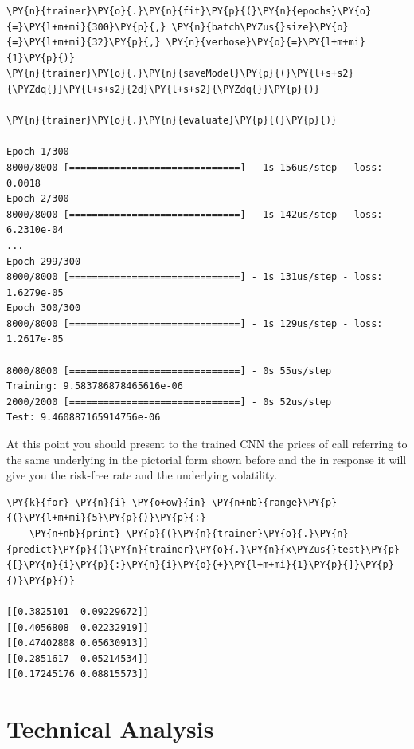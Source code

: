 \begin{tcolorbox}[breakable, size=fbox, boxrule=1pt, pad at break*=1mm,colback=cellbackground, colframe=cellborder]
\begin{Verbatim}[commandchars=\\\{\}]
\PY{n}{trainer}\PY{o}{.}\PY{n}{fit}\PY{p}{(}\PY{n}{epochs}\PY{o}{=}\PY{l+m+mi}{300}\PY{p}{,} \PY{n}{batch\PYZus{}size}\PY{o}{=}\PY{l+m+mi}{32}\PY{p}{,} \PY{n}{verbose}\PY{o}{=}\PY{l+m+mi}{1}\PY{p}{)}
\PY{n}{trainer}\PY{o}{.}\PY{n}{saveModel}\PY{p}{(}\PY{l+s+s2}{\PYZdq{}}\PY{l+s+s2}{2d}\PY{l+s+s2}{\PYZdq{}}\PY{p}{)}
	
\PY{n}{trainer}\PY{o}{.}\PY{n}{evaluate}\PY{p}{(}\PY{p}{)}

Epoch 1/300
8000/8000 [==============================] - 1s 156us/step - loss: 0.0018
Epoch 2/300
8000/8000 [==============================] - 1s 142us/step - loss: 6.2310e-04
...
Epoch 299/300
8000/8000 [==============================] - 1s 131us/step - loss: 1.6279e-05
Epoch 300/300
8000/8000 [==============================] - 1s 129us/step - loss: 1.2617e-05

8000/8000 [==============================] - 0s 55us/step
Training: 9.583786878465616e-06
2000/2000 [==============================] - 0s 52us/step
Test: 9.460887165914756e-06
\end{Verbatim}
\end{tcolorbox}

At this point you should present to the trained CNN the prices of call
referring to the same underlying in the pictorial form shown before and
the in response it will give you the risk-free rate and the underlying
volatility.

\begin{tcolorbox}[breakable, size=fbox, boxrule=1pt, pad at break*=1mm,colback=cellbackground, colframe=cellborder]
\begin{Verbatim}[commandchars=\\\{\}]
\PY{k}{for} \PY{n}{i} \PY{o+ow}{in} \PY{n+nb}{range}\PY{p}{(}\PY{l+m+mi}{5}\PY{p}{)}\PY{p}{:}
    \PY{n+nb}{print} \PY{p}{(}\PY{n}{trainer}\PY{o}{.}\PY{n}{predict}\PY{p}{(}\PY{n}{trainer}\PY{o}{.}\PY{n}{x\PYZus{}test}\PY{p}{[}\PY{n}{i}\PY{p}{:}\PY{n}{i}\PY{o}{+}\PY{l+m+mi}{1}\PY{p}{]}\PY{p}{)}\PY{p}{)}

[[0.3825101  0.09229672]]
[[0.4056808  0.02232919]]
[[0.47402808 0.05630913]]
[[0.2851617  0.05214534]]
[[0.17245176 0.08815573]]
\end{Verbatim}
\end{tcolorbox}

\section{Technical Analysis}\label{technical-analysis}

